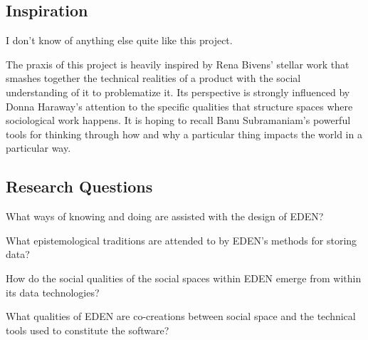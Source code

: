 \documentclass[a4paper,man,natbib]{apa6}
\begin{document}
   \subsection*{Inspiration}
   I don't know of anything else quite like this project.

   The praxis of this project is heavily inspired by Rena Bivens' stellar work that smashes together the technical realities of a product with the social understanding of it to problematize it. Its perspective is strongly influenced by Donna Haraway's attention to the specific qualities  that structure spaces where sociological work happens. It is hoping to recall Banu Subramaniam's powerful tools for thinking through how and why a particular thing impacts the world in a particular way.

   \subsection*{Research Questions}
   What ways of knowing and doing are assisted with the design of \acrshort{EDEN}?

   What epistemological traditions are attended to by \acrshort{EDEN}'s methods for storing data? 

   How do the social qualities of the social spaces within \acrshort{EDEN} emerge from within its data technologies?

   What qualities of \acrshort{EDEN} are co-creations between social space and the technical tools used to constitute the software?
\end{document}
